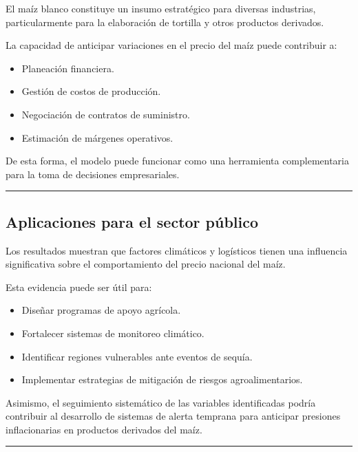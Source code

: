 \documentclass[11pt]{article}
\providecommand{\tightlist}{%
      \setlength{\itemsep}{0pt}\setlength{\parskip}{0pt}}
\begin{document}
El maíz blanco constituye un insumo estratégico para diversas
industrias, particularmente para la elaboración de tortilla y otros
productos derivados.

La capacidad de anticipar variaciones en el precio del maíz puede
contribuir a:

\begin{itemize}
\tightlist
\item
  Planeación financiera.
\item
  Gestión de costos de producción.
\item
  Negociación de contratos de suministro.
\item
  Estimación de márgenes operativos.
\end{itemize}

De esta forma, el modelo puede funcionar como una herramienta
complementaria para la toma de decisiones empresariales.

\begin{center}\rule{0.5\linewidth}{0.5pt}\end{center}

\hypertarget{aplicaciones-para-el-sector-puxfablico}{%
\subsection{Aplicaciones para el sector
público}\label{aplicaciones-para-el-sector-puxfablico}}

Los resultados muestran que factores climáticos y logísticos tienen una
influencia significativa sobre el comportamiento del precio nacional del
maíz.

Esta evidencia puede ser útil para:

\begin{itemize}
\tightlist
\item
  Diseñar programas de apoyo agrícola.
\item
  Fortalecer sistemas de monitoreo climático.
\item
  Identificar regiones vulnerables ante eventos de sequía.
\item
  Implementar estrategias de mitigación de riesgos agroalimentarios.
\end{itemize}

Asimismo, el seguimiento sistemático de las variables identificadas
podría contribuir al desarrollo de sistemas de alerta temprana para
anticipar presiones inflacionarias en productos derivados del maíz.

\begin{center}\rule{0.5\linewidth}{0.5pt}\end{center}
\end{document}
